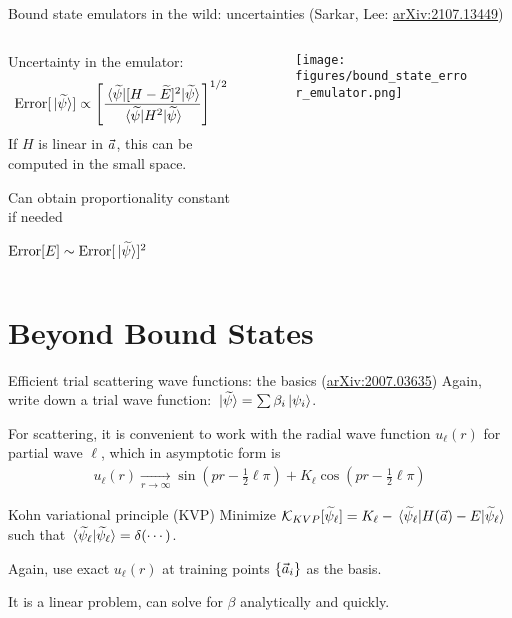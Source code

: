 \documentclass[xcolor=dvipsnames, aspectratio=169]{beamer}
\begin{document}
\begin{frame}{Bound state emulators in the wild: uncertainties (\alert{Sarkar, Lee: \href{https://arxiv.org/abs/2107.13449}{arXiv:2107.13449}})}
\begin{columns}[t]
\begin{column}{0.5\textwidth}
Uncertainty in the emulator:
\begin{align*}
\textup{Error}[\ket*{\widetilde{\psi}}] \propto \left[\frac{\mel*{\widetilde{\psi}}{[H - \widetilde{E}]^2}{\widetilde{\psi}}}{\mel*{\widetilde{\psi}}{H^2}{\widetilde{\psi}}}\right]^{1/2}
\end{align*}
If $H$ is linear in $\vec{a}$, this can be computed in the small space.

\vspace{0.2cm}
Can obtain proportionality constant if needed

\vspace{0.2cm}
$\textup{Error}[E] \sim \textup{Error}[\ket*{\widetilde{\psi}}]^2$
\end{column}
\begin{column}{0.5\textwidth}
\begin{figure}
\vspace{-0.4cm}
\texttt{[image: figures/bound\_state\_error\_emulator.png]}
\end{figure}
\end{column}
\end{columns}
\end{frame}


\section{Beyond Bound States}

\begin{frame}[t]{Efficient trial scattering wave functions: the basics (\alert{\href{https://arxiv.org/abs/2007.03635}{arXiv:2007.03635}})}
Again, write down a \alert{trial wave function}: $\ket*{\widetilde{\psi}} = \sum \beta_i \ket*{\psi_i}$.

For scattering, it is convenient to work with the radial wave function $u_\ell(r)$ for partial wave $\ell$, which in asymptotic form is
\begin{align*}
    u_\ell(r) \xrightarrow[r\to\infty]{} \sin(pr - \frac{1}{2}\ell\pi) + K_\ell \cos(pr - \frac{1}{2}\ell\pi)
\end{align*}

\begin{myblock}[valign=center]{Kohn variational principle (KVP)}
Minimize $\mathcal{K}_{KVP}[\widetilde{\psi}_\ell] = K_\ell - \mel*{\widetilde{\psi}_\ell}{H(\vec{a}) - E}{\widetilde{\psi}_\ell}$ such that $\braket*{\widetilde{\psi}_\ell}{\widetilde{\psi}_\ell} = \delta(\cdots)$.
\end{myblock}%

Again, use exact $u_\ell(r)$ at training points $\{\vec{a}_i\}$ as the basis.

It is a linear problem, can solve for $\beta$ analytically and quickly.
\end{frame}
\end{document}
